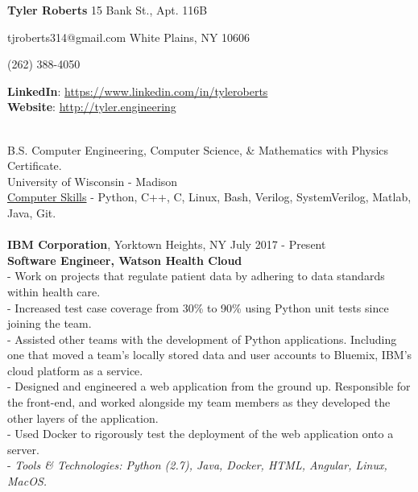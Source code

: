 \documentclass{resume}
\begin{document}
\begin{adjustwidth}{75mm}{}
{\LARGE \bf Tyler Roberts} \hfill 15 Bank St., Apt. 116B
\end{adjustwidth}
\begin{adjustwidth}{80mm}{}
{\normalsize tjroberts314@gmail.com} \hfill White Plains, NY 10606
\end{adjustwidth}
\begin{adjustwidth}{87.5mm}{}
{\normalsize (262) 388-4050}
\end{adjustwidth}
\begin{flushleft}
	\textbf{LinkedIn}:
	\href{https://www.linkedin.com/in/tyleroberts}{https://www.linkedin.com/in/tyleroberts} \\
	\textbf{Website}:
	\href{http://tyler.engineering}{http://tyler.engineering} \vspace{\baselineskip}

 \\
{\bigsize
B.S. Computer Engineering, Computer Science, \& Mathematics with Physics Certificate. \\
University of Wisconsin - Madison \\
\underline{Computer Skills} - Python, C++, C, Linux, Bash, Verilog, SystemVerilog, Matlab, Java, Git.} \\[5mm]
\\[2mm]

\textbf{IBM Corporation}, Yorktown Heights, NY \hfill July 2017 - Present\\
\textbf{Software Engineer, Watson Health Cloud}\\
{\footnotesize
	\ttab- Work on projects that regulate patient data by adhering to data standards within health care.\\
	\ttab- Increased test case coverage from 30\% to 90\% using Python unit tests since joining the team. \\
	\ttab- Assisted other teams with the development of Python applications. Including one that moved a team's locally stored data
	\ttab and user accounts to Bluemix, IBM's cloud platform as a service. \\
	\ttab- Designed and engineered a web application from the ground up. Responsible for the front-end, and worked alongside \ttab my team members as they developed the other layers of the application. \\
	\ttab - Used Docker to rigorously test the deployment of the web application onto a server. \\
	\ttab- \textit{Tools \& Technologies: Python (2.7), Java, Docker, HTML, Angular, Linux, MacOS.}\\[3mm]
}


\end{flushleft}
\end{document}
